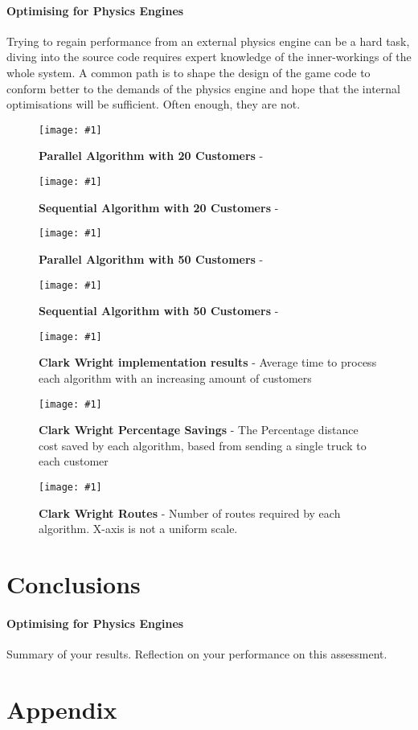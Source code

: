 \documentclass[conference]{acmsiggraph}
\newcommand{\figuremacroW}[4]{
	\begin{figure}[h] %
		\centering
		\texttt{[image: \#1]}
		\caption[#2]{\textbf{#2} - #3}
		\label{fig:#1}
	\end{figure}
}
\newcommand{\figuremacroF}[4]{
	\begin{figure*}[t] %
		\centering
		\texttt{[image: \#1]}
		\caption[#2]{\textbf{#2} - #3}
		\label{fig:#1}
	\end{figure*}
}
\begin{document}
\paragraph{Optimising for Physics Engines}
Trying to regain performance from an external physics engine can be a hard task, diving into the source code requires expert knowledge of the inner-workings of the whole system. A common path is to shape the design of the game code to conform better to the demands of the physics engine and hope that the internal optimisations  will be sufficient. Often enough, they are not.

\figuremacroW
{rand00020cwpsn}
{Parallel Algorithm with 20 Customers}
{}
{0.8}

\figuremacroW
{rand00020cwsn}
{Sequential Algorithm with 20 Customers}
{}
{0.8}

\lipsum

\figuremacroW
{rand00050cwpsn}
{Parallel Algorithm with 50 Customers}
{}
{0.8}

\figuremacroW
{rand00050cwsn}
{Sequential Algorithm with 50 Customers}
{}
{0.8}


\figuremacroF
{chart1}
{Clark Wright implementation results}
{Average time to process each algorithm with an increasing amount of customers}
{1.0}

\figuremacroF
{chart2}
{Clark Wright Percentage Savings}
{The Percentage distance cost saved by each algorithm, based from sending a single truck to each customer}
{1.0}

\figuremacroF
{chart3}
{Clark Wright Routes}
{Number of routes required by each algorithm. X-axis is not a uniform scale.}
{1.0}

\section{Conclusions}

\paragraph{Optimising for Physics Engines}
Summary of your results.
Reflection on your performance on this assessment. 

\section{Appendix}




\afterpage{\clearpage}
\end{document}
